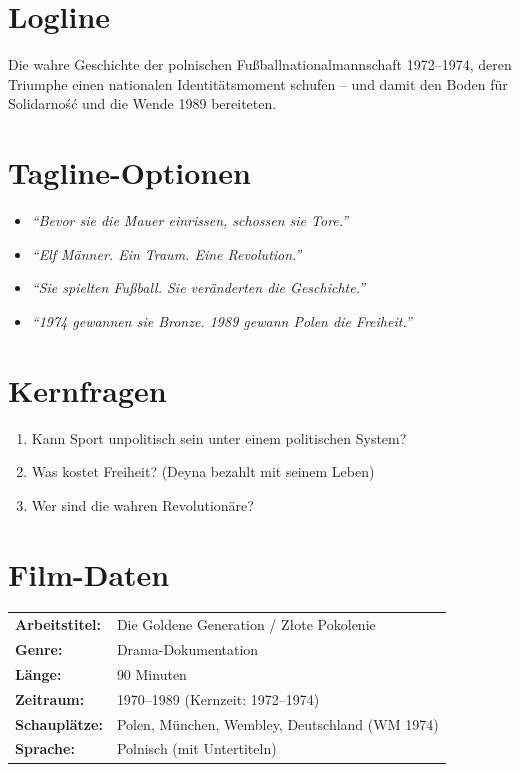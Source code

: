 \documentclass[11pt,a4paper]{book}
\newenvironment{filminfo}{%
  \begin{mdframed}[
    linecolor=darkgray,
    linewidth=1pt,
    backgroundcolor=gray!5,
    innertopmargin=10pt,
    innerbottommargin=10pt
  ]
}{%
  \end{mdframed}
}
\begin{document}
\section{Logline}

Die wahre Geschichte der polnischen Fußballnationalmannschaft 1972--1974, deren Triumphe einen nationalen Identitätsmoment schufen -- und damit den Boden für Solidarność und die Wende 1989 bereiteten.

\section{Tagline-Optionen}

\begin{itemize}
    \item \textit{``Bevor sie die Mauer einrissen, schossen sie Tore.''}
    \item \textit{``Elf Männer. Ein Traum. Eine Revolution.''}
    \item \textit{``Sie spielten Fußball. Sie veränderten die Geschichte.''}
    \item \textit{``1974 gewannen sie Bronze. 1989 gewann Polen die Freiheit.''}
\end{itemize}

\section{Kernfragen}

\begin{enumerate}
    \item Kann Sport unpolitisch sein unter einem politischen System?
    \item Was kostet Freiheit? (Deyna bezahlt mit seinem Leben)
    \item Wer sind die wahren Revolutionäre?
\end{enumerate}

\section{Film-Daten}

\begin{filminfo}
\begin{tabular}{@{}ll@{}}
\textbf{Arbeitstitel:} & Die Goldene Generation / Złote Pokolenie \\
\textbf{Genre:} & Drama-Dokumentation \\
\textbf{Länge:} & 90 Minuten \\
\textbf{Zeitraum:} & 1970--1989 (Kernzeit: 1972--1974) \\
\textbf{Schauplätze:} & Polen, München, Wembley, Deutschland (WM 1974) \\
\textbf{Sprache:} & Polnisch (mit Untertiteln) \\
\end{tabular}
\end{filminfo}
\end{document}

